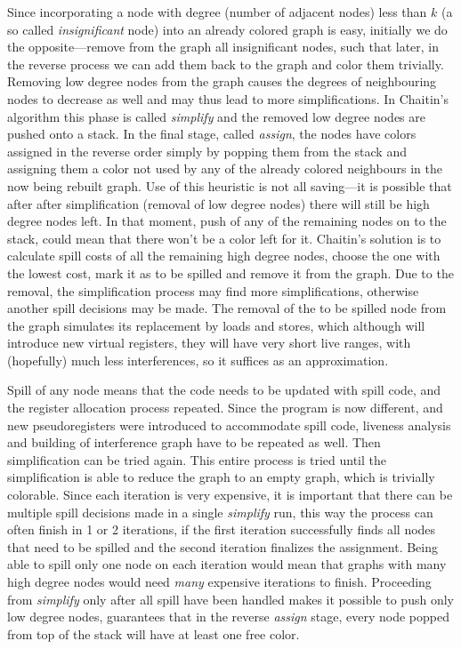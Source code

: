 Since incorporating a node with degree (number of adjacent nodes) less than $k$
(a so called {\em insignificant}
node) into an already colored graph is easy, initially we do the
opposite---remove from the graph all insignificant nodes, such that later, in
the reverse process we can add them back to the graph and color them trivially.
Removing low degree nodes from the graph causes the degrees of neighbouring
nodes to decrease as well and may thus lead to more simplifications. In
Chaitin's algorithm this phase is called {\em simplify} and the
removed low degree nodes are pushed onto a stack. In the final stage, called {\em
assign}, the nodes have colors assigned in the reverse order simply by popping
them from the stack and assigning them a color not used by any of the already
colored neighbours in the now being rebuilt graph. Use of this heuristic is not
all saving---it is possible that after after simplification (removal of low
degree nodes) there will still be high degree nodes left. In that moment, push
of any of the remaining nodes on to the stack, could mean that there won't be a
color left for it. Chaitin's solution is to calculate spill costs of all the
remaining high degree nodes, choose the one with the lowest cost, mark it as
to be spilled and remove it from the graph. Due to the removal, the
simplification process may find more simplifications, otherwise another spill
decisions may be made. The removal of the to be spilled node from the graph
simulates its replacement by loads and stores, which although will introduce new
virtual registers, they will have very short live ranges, with (hopefully) much
less interferences, so it suffices as an approximation.

Spill of any node means that the code needs to be updated with spill code, and
the register allocation process repeated. Since the program is now different,
and new pseudoregisters were introduced to accommodate spill code,
liveness analysis and building of interference graph have to be repeated as
well. Then simplification can be tried again. This entire process is tried
until the simplification is able to reduce the graph to an empty graph, which is
trivially colorable. Since each iteration is very expensive, it is important
that there can be multiple spill decisions made in a single {\em simplify} run,
this way the process can often finish in 1 or 2 iterations, if the first
iteration successfully finds all nodes that need to be spilled and the second
iteration finalizes the assignment.
Being able to spill only one node on each iteration would mean that graphs with
many high degree nodes would need {\em many} expensive iterations to finish.
Proceeding from {\em simplify} only after all spill have been handled makes it
possible to push only low degree nodes, guarantees that in the reverse {\em
assign} stage, every node popped from top of the stack will have at least one
free color.

